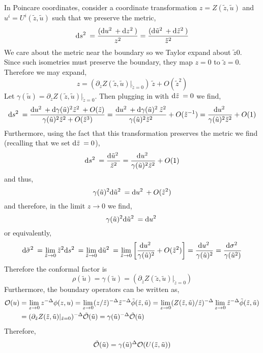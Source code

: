 \documentclass[12pt]{article}
\begin{document}
In Poincare coordinates, consider a coordinate transformation $z = Z(\tilde{z}, \tilde{u})$ and $u^i = U^i(\tilde{z}, \tilde{u})$ such that we preserve the metric,
\[ \mathrm{d}s^2 \: = \frac{(\mathrm{d}u^2 \: + \mathrm{d}z^2 \:)}{z^2} = \frac{(\mathrm{d}\tilde{u}^2 \: + \mathrm{d}\tilde{z}^2 \:)}{\tilde{z}^2} \]
We care about the metric near the boundary so we Taylor expand about $\tilde{z} 0$. Since such isometries must preserve the boundary, they map $z = 0$ to $\tilde{z} = 0$. Therefore we may expand,
\[ z = (\partial_{\tilde{z}} Z(\tilde{z}, \tilde{u}) |_{\tilde{z} = 0}) \: \tilde{z} + O(\tilde{z}^2) \]
Let $\gamma(\tilde{u}) = \partial_{\tilde{z}} Z(\tilde{z}, \tilde{u}) |_{\tilde{z} = 0}$. Then plugging in with $\mathrm{d}\tilde{z} \: = 0$ we find,
\[ \mathrm{d}s^2 \: = \frac{\mathrm{d}u^2 \: + \mathrm{d}\gamma(\tilde{u})^2 \tilde{z}^2 \: + O(\tilde{z})}{\gamma(\tilde{u})^2 \tilde{z}^2 + O(\tilde{z}^3)} = \frac{\mathrm{d}u^2 \: + \mathrm{d}\gamma(\tilde{u})^2 \: \tilde{z}^2}{\gamma(\tilde{u})^2 \tilde{z}^2} + O(\tilde{z}^{-1}) = \frac{\mathrm{d}u^2 \:}{\gamma(\tilde{u})^2 \tilde{z}^2} + O(1)  \] 
Furthermore, using the fact that this transformation preserves the metric we find (recalling that we set $\mathrm{d}\tilde{z} \: = 0$),
\[ \mathrm{d}s^2 \: = \frac{\mathrm{d}\tilde{u}^2 \:}{\tilde{z}^2} = \frac{\mathrm{d}u^2 \:}{\gamma(\tilde{u})^2 \tilde{z}^2} + O(1)  \]
and thus,
\[ \gamma(\tilde{u})^2 \mathrm{d}\tilde{u}^2 \: = \mathrm{d}u^2 \: + O(\tilde{z}^2) \]
and therefore, in the limit $z \to 0$ we find,
\[ \gamma(\tilde{u})^2 \mathrm{d}\tilde{u}^2 \: = \mathrm{d}u^2 \: \]
or equivalently,
\[ \mathrm{d}\tilde{\sigma}^2 \: = \lim_{\tilde{z} \to 0} \tilde{z}^2 \mathrm{d}s^2 \: = \lim_{\tilde{z} \to 0} \mathrm{d}\tilde{u}^2 \: = \lim_{\tilde{z} \to 0} \left[ \frac{\mathrm{d}u^2 \:}{\gamma(\tilde{u})^2} + O(\tilde{z}^2) \right] = \frac{\mathrm{d}u^2 \:}{\gamma(\tilde{u})^2} = \frac{\mathrm{d}\sigma^2 \:}{\gamma(\tilde{u}^2)} \] 
Therefore the conformal factor is 
\[ \rho(\tilde{u}) = \gamma(\tilde{u}) = (\partial_{\tilde{z}} Z(\tilde{z}, \tilde{u}) |_{\tilde{z} = 0}) \]
Furthermore, the boundary operators can be written as,
\begin{align*}
\mathcal{O}(u) & = \lim_{z \to 0} z^{-\Delta} \phi(z, u) = \lim_{z \to 0} (z / \tilde{z})^{-\Delta} \tilde{z}^{-\Delta} \tilde{\phi}(\tilde{z}, \tilde{u}) = \lim_{z \to 0} (Z(\tilde{z}, \tilde{u}) / \tilde{z})^{-\Delta} \lim_{z \to 0} \tilde{z}^{-\Delta} \tilde{\phi}(\tilde{z}, \tilde{u}) 
\\
& = (\partial_{\tilde{z}} Z(\tilde{z}, \tilde{u})|_{\tilde{z} = 0})^{-\Delta} \tilde{\mathcal{O}}(\tilde{u}) = \gamma(\tilde{u})^{- \Delta} \tilde{\mathcal{O}}(\tilde{u})
\end{align*}
Therefore,
\[ \tilde{\mathcal{O}}(\tilde{u}) = \gamma(\tilde{u})^{\Delta} \mathcal{O}(U(\tilde{z}, \tilde{u})) \]
\end{document}
